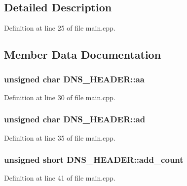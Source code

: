 \subsection{Detailed Description}


Definition at line 25 of file main.\-cpp.



\subsection{Member Data Documentation}
\hypertarget{struct_d_n_s___h_e_a_d_e_r_a0b35c4f2cf9cc0d1555afa24676c2b26}{
\subsubsection[{aa}]{\setlength{\rightskip}{0pt plus 5cm}unsigned char D\-N\-S\-\_\-\-H\-E\-A\-D\-E\-R\-::aa}}\label{struct_d_n_s___h_e_a_d_e_r_a0b35c4f2cf9cc0d1555afa24676c2b26}


Definition at line 30 of file main.\-cpp.

\hypertarget{struct_d_n_s___h_e_a_d_e_r_a61bfa8d857d74fb70872b179ddbe59e5}{
\subsubsection[{ad}]{\setlength{\rightskip}{0pt plus 5cm}unsigned char D\-N\-S\-\_\-\-H\-E\-A\-D\-E\-R\-::ad}}\label{struct_d_n_s___h_e_a_d_e_r_a61bfa8d857d74fb70872b179ddbe59e5}


Definition at line 35 of file main.\-cpp.

\hypertarget{struct_d_n_s___h_e_a_d_e_r_a62902698d81157eba889e57f56b11702}{
\subsubsection[{add\-\_\-count}]{\setlength{\rightskip}{0pt plus 5cm}unsigned short D\-N\-S\-\_\-\-H\-E\-A\-D\-E\-R\-::add\-\_\-count}}\label{struct_d_n_s___h_e_a_d_e_r_a62902698d81157eba889e57f56b11702}


Definition at line 41 of file main.\-cpp.

